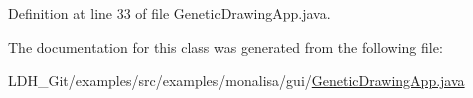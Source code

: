 Definition at line 33 of file Genetic\-Drawing\-App.\-java.



The documentation for this class was generated from the following file\-:\begin{DoxyCompactItemize}
\item 
L\-D\-H\-\_\-\-Git/examples/src/examples/monalisa/gui/\hyperlink{monalisa_2gui_2_genetic_drawing_app_8java}{Genetic\-Drawing\-App.\-java}\end{DoxyCompactItemize}
